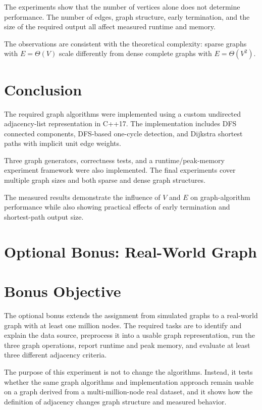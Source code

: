 \documentclass[11pt]{article}
\begin{document}
The experiments show that the number of vertices alone does not determine
performance. The number of edges, graph structure, early termination, and the
size of the required output all affect measured runtime and memory.

The observations are consistent with the theoretical complexity: sparse
graphs with $E=\Theta(V)$ scale differently from dense complete graphs with
$E=\Theta(V^2)$.

\section{Conclusion}

The required graph algorithms were implemented using a custom undirected
adjacency-list representation in C++17. The implementation includes DFS
connected components, DFS-based one-cycle detection, and Dijkstra shortest
paths with implicit unit edge weights.

Three graph generators, correctness tests, and a runtime/peak-memory
experiment framework were also implemented. The final experiments cover
multiple graph sizes and both sparse and dense graph structures.

The measured results demonstrate the influence of $V$ and $E$ on
graph-algorithm performance while also showing practical effects of early
termination and shortest-path output size.


\clearpage
\section{Optional Bonus: Real-World Graph}

\section{Bonus Objective}
The optional bonus extends the assignment from simulated graphs to a real-world graph with at least one million nodes. The required tasks are to identify and explain the data source, preprocess it into a usable graph representation, run the three graph operations, report runtime and peak memory, and evaluate at least three different adjacency criteria.

The purpose of this experiment is not to change the algorithms. Instead, it tests whether the same graph algorithms and implementation approach remain usable on a graph derived from a multi-million-node real dataset, and it shows how the definition of adjacency changes graph structure and measured behavior.
\end{document}
